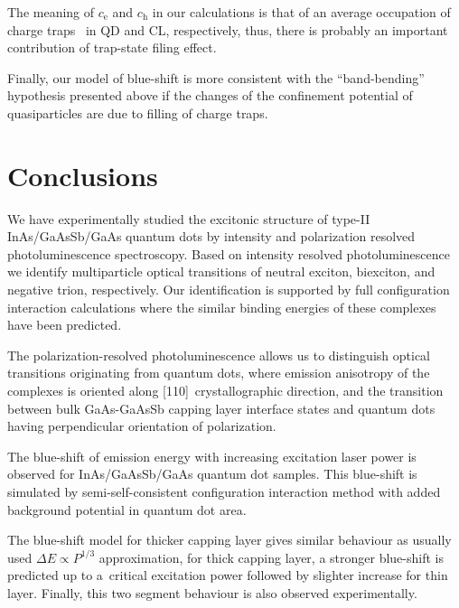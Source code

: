 The meaning of $c_\mathrm{e}$ and $c_\mathrm{h}$ in our calculations is that of an average occupation of charge traps~\cite{Reimer2016} in QD and CL, respectively, thus, there is probably an important contribution of trap-state filing effect. 

Finally, our model of blue-shift is more consistent with the \enquote{band-bending} hypothesis presented above if the changes of the confinement potential of quasiparticles are due to filling of charge traps.

\section*{Conclusions}
We have experimentally studied the excitonic structure of type-II InAs/GaAsSb/GaAs quantum dots by intensity and polarization resolved photoluminescence spectroscopy. Based on intensity resolved photoluminescence we identify multiparticle optical transitions of neutral exciton, biexciton, and negative trion, respectively. Our identification is supported by full configuration interaction calculations where the similar binding energies of these complexes have been predicted. 

The polarization-resolved photoluminescence allows us to distinguish optical transitions originating from quantum dots, where emission anisotropy of the complexes is oriented along [110]~crystallographic direction, and the transition between bulk GaAs-GaAsSb capping layer interface states and quantum dots having perpendicular orientation of polarization.

The blue-shift of emission energy with increasing excitation laser power is observed for InAs/GaAsSb/GaAs quantum dot samples. This blue-shift is simulated by semi-self-consistent configuration interaction method with added background potential in quantum dot area.

The blue-shift model for thicker capping layer gives similar behaviour as usually used $\Delta E\propto P^{1/3}$ approximation, for thick capping layer, a stronger blue-shift is predicted up to a~critical excitation power followed by slighter increase for thin layer. Finally, this two segment behaviour is also observed experimentally.
\newpage